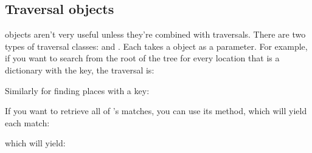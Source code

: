 \documentclass[letterpaper,10pt,english]{sphinxmanual}
\begin{document}
\subsection{Traversal objects}
\label{\detokenize{treehorn:traversal-objects}}
 objects aren’t very useful unless they’re combined with traversals. There are two types of traversal classes:  and . Each takes a  object as a parameter. For example, if you want to search from the root of the tree for every location that is a dictionary with the  key, the traversal is:

%
\begin{sphinxVerbatim}[commandchars=\\\{\}]
    
\end{sphinxVerbatim}

Similarly for finding places with a  key:

%
\begin{sphinxVerbatim}[commandchars=\\\{\}]
    
\end{sphinxVerbatim}

If you want to retrieve all of ’s matches, you can use its  method, which will yield each match:

%
\begin{sphinxVerbatim}[commandchars=\\\{\}]
   
\end{sphinxVerbatim}

which will yield:
\end{document}
